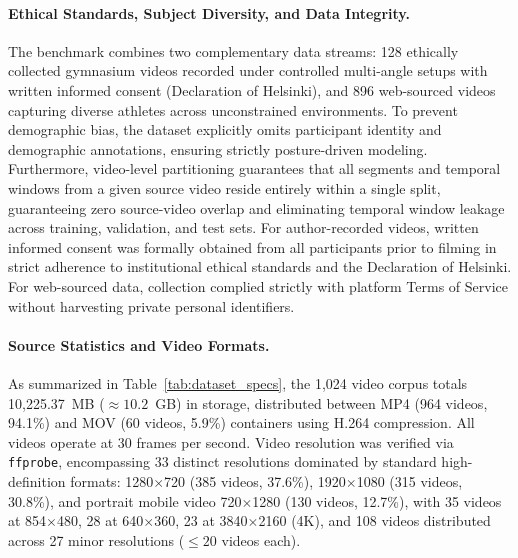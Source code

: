 \documentclass[preprint,12pt]{elsarticle}
\begin{document}
\paragraph{Ethical Standards, Subject Diversity, and Data Integrity.}
The benchmark combines two complementary data streams: 128 ethically collected gymnasium videos recorded under controlled multi-angle setups with written informed consent (Declaration of Helsinki), and 896 web-sourced videos capturing diverse athletes across unconstrained environments. To prevent demographic bias, the dataset explicitly omits participant identity and demographic annotations, ensuring strictly posture-driven modeling. Furthermore, video-level partitioning guarantees that all segments and temporal windows from a given source video reside entirely within a single split, guaranteeing zero source-video overlap and eliminating temporal window leakage across training, validation, and test sets. For author-recorded videos, written informed consent was formally obtained from all participants prior to filming in strict adherence to institutional ethical standards and the Declaration of Helsinki. For web-sourced data, collection complied strictly with platform Terms of Service without harvesting private personal identifiers.

\paragraph{Source Statistics and Video Formats.} As summarized in Table~\ref{tab:dataset_specs}, the 1,024 video corpus totals 10,225.37~MB ($\approx 10.2$~GB) in storage, distributed between MP4 (964 videos, 94.1\%) and MOV (60 videos, 5.9\%) containers using H.264 compression. All videos operate at 30 frames per second. Video resolution was verified via \texttt{ffprobe}, encompassing 33 distinct resolutions dominated by standard high-definition formats: 1280$\times$720 (385 videos, 37.6\%), 1920$\times$1080 (315 videos, 30.8\%), and portrait mobile video 720$\times$1280 (130 videos, 12.7\%), with 35 videos at 854$\times$480, 28 at 640$\times$360, 23 at 3840$\times$2160 (4K), and 108 videos distributed across 27 minor resolutions ($\le 20$ videos each).
\end{document}

